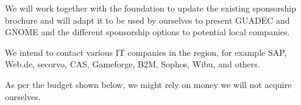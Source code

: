 We will work together with the foundation to update the existing sponsorship
brochure and will adapt it to be used by ourselves to present GUADEC and GNOME
and the different sponsorship options to potential local companies.

We intend to contact various IT companies in the region, for example SAP, Web.de, secorvo, 
CAS, Gameforge, B2M, 
Sophos, Wibu,
and others.


As per the budget shown below, we might rely on money we will not acquire ourselves.
